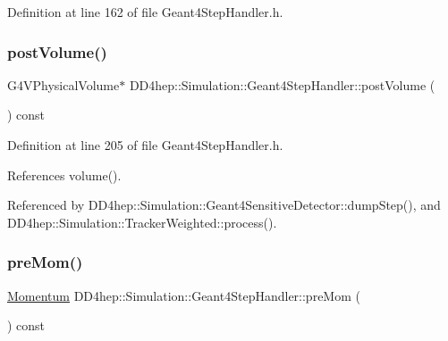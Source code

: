 Definition at line 162 of file Geant4\+Step\+Handler.\+h.

\hypertarget{class_d_d4hep_1_1_simulation_1_1_geant4_step_handler_afee73068f429b8f9956acad5580493a9}{}\label{class_d_d4hep_1_1_simulation_1_1_geant4_step_handler_afee73068f429b8f9956acad5580493a9} 
\subsubsection{\texorpdfstring{post\+Volume()}{postVolume()}}
{\footnotesize\ttfamily G4\+V\+Physical\+Volume$\ast$ D\+D4hep\+::\+Simulation\+::\+Geant4\+Step\+Handler\+::post\+Volume (\begin{DoxyParamCaption}{ }\end{DoxyParamCaption}) const\hspace{0.3cm}{\ttfamily [inline]}}



Definition at line 205 of file Geant4\+Step\+Handler.\+h.



References volume().



Referenced by D\+D4hep\+::\+Simulation\+::\+Geant4\+Sensitive\+Detector\+::dump\+Step(), and D\+D4hep\+::\+Simulation\+::\+Tracker\+Weighted\+::process().

\hypertarget{class_d_d4hep_1_1_simulation_1_1_geant4_step_handler_ac04cff5a17eae75d0ce7ff1e496e5885}{}\label{class_d_d4hep_1_1_simulation_1_1_geant4_step_handler_ac04cff5a17eae75d0ce7ff1e496e5885} 
\subsubsection{\texorpdfstring{pre\+Mom()}{preMom()}}
{\footnotesize\ttfamily \hyperlink{namespace_d_d4hep_1_1_simulation_aead01eb580dc503a5abba194d179c963}{Momentum} D\+D4hep\+::\+Simulation\+::\+Geant4\+Step\+Handler\+::pre\+Mom (\begin{DoxyParamCaption}{ }\end{DoxyParamCaption}) const\hspace{0.3cm}{\ttfamily [inline]}}




